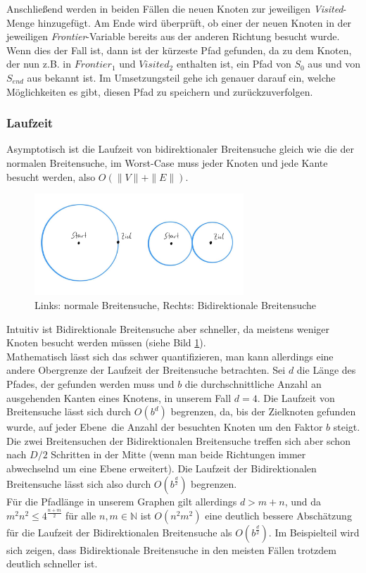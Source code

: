 \documentclass[a4paper,10pt,ngerman]{scrartcl}
\begin{document}
    Anschließend werden in beiden Fällen die neuen Knoten zur jeweiligen \textit{Visited}-Menge hinzugefügt.
    Am Ende wird überprüft, ob einer der neuen Knoten in der jeweiligen \textit{Frontier}-Variable bereits aus der anderen Richtung besucht wurde. Wenn dies der Fall ist, dann ist der kürzeste Pfad gefunden, da zu dem Knoten, der nun z.B. in $\textit{Frontier}_1$ und $\textit{Visited}_2$ enthalten ist, ein Pfad von $S_0$ aus und von $S_{end}$ aus bekannt ist. Im Umsetzungsteil gehe ich genauer darauf ein, welche Möglichkeiten es gibt, diesen Pfad zu speichern und zurückzuverfolgen.

    \subsubsection{Laufzeit}
    Asymptotisch ist die Laufzeit von bidirektionaler Breitensuche gleich wie die der normalen Breitensuche, im Worst-Case muss jeder Knoten und jede Kante besucht werden, also $O(\|V\| + \|E\|)$.
    \begin{figure}[H]
        \label{fig:1}
        \centering
        \includegraphics[width=0.7\textwidth]{Assets/zeichnung}
        \caption {Links: normale Breitensuche, Rechts: Bidirektionale Breitensuche}
    \end{figure}

    Intuitiv ist Bidirektionale Breitensuche aber schneller, da meistens weniger Knoten besucht werden müssen (siehe Bild \ref{fig:1}). \\
    Mathematisch lässt sich das schwer quantifizieren, man kann allerdings eine andere Obergrenze der Laufzeit der Breitensuche betrachten. Sei $d$ die Länge des Pfades, der gefunden werden muss und $b$ die durchschnittliche Anzahl an ausgehenden Kanten eines Knotens, in unserem Fall $d = 4$.
    Die Laufzeit von Breitensuche lässt sich durch $O(b^d)$ begrenzen, da, bis der Zielknoten gefunden wurde, auf jeder \glqq Ebene\grqq\ die Anzahl der besuchten Knoten um den Faktor $b$ steigt.\\
    Die zwei Breitensuchen der Bidirektionalen Breitensuche treffen sich aber schon nach $D/2$ Schritten in der Mitte (wenn man beide Richtungen immer abwechselnd um eine Ebene erweitert).
    Die Laufzeit der Bidirektionalen Breitensuche lässt sich also durch $O(b^{\frac d 2})$ begrenzen. \\
    Für die Pfadlänge in unserem Graphen gilt allerdings $d > m + n$, und da $m^2 n^2  \le 4^{\frac {n + m} 2}$ für alle $n, m \in \mathbb N$ ist $O(n^2 m^2)$ eine deutlich bessere Abschätzung für die Laufzeit der Bidirektionalen Breitensuche als $O(b^{\frac d 2})$.
    Im Beispielteil wird sich zeigen, dass Bidirektionale Breitensuche in den meisten Fällen trotzdem deutlich schneller ist.
\end{document}
